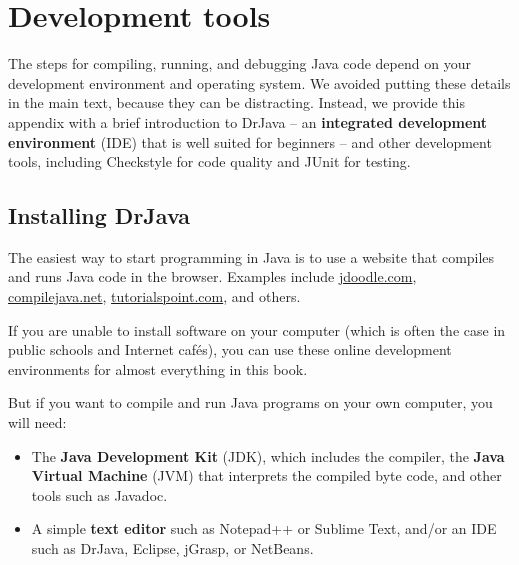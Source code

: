 \documentclass[12pt]{book}
\theoremstyle{exercise}
\begin{document}
\appendix
\renewcommand{\chaptermark}[1]{\markboth{Appendix \thechapter ~~ #1}{}}


\chapter{Development tools}
\label{development}

The steps for compiling, running, and debugging Java code depend on your development environment and operating system.
We avoided putting these details in the main text, because they can be distracting.
Instead, we provide this appendix with a brief introduction to DrJava -- an {\bf integrated development environment} (IDE) that is well suited for beginners -- and other development tools, including Checkstyle for code quality and JUnit for testing.



\section{Installing DrJava}
\label{drjava}

The easiest way to start programming in Java is to use a website that compiles and runs Java code in the browser.
Examples include \href{https://www.jdoodle.com/}{jdoodle.com}, \href{https://www.compilejava.net/}{compilejava.net}, \href{http://tutorialspoint.com/}{tutorialspoint.com}, and others.

If you are unable to install software on your computer (which is often the case in public schools and Internet caf\'{e}s), you can use these online development environments for almost everything in this book.

But if you want to compile and run Java programs on your own computer, you will need:

\begin{itemize}

\item The {\bf Java Development Kit} (JDK), which includes the compiler, the {\bf Java Virtual Machine} (JVM) that interprets the compiled byte code, and other tools such as Javadoc.



\item A simple {\bf text editor} such as Notepad++ or Sublime Text, and/or an IDE such as DrJava, Eclipse, jGrasp, or NetBeans.

\end{itemize}
\end{document}
